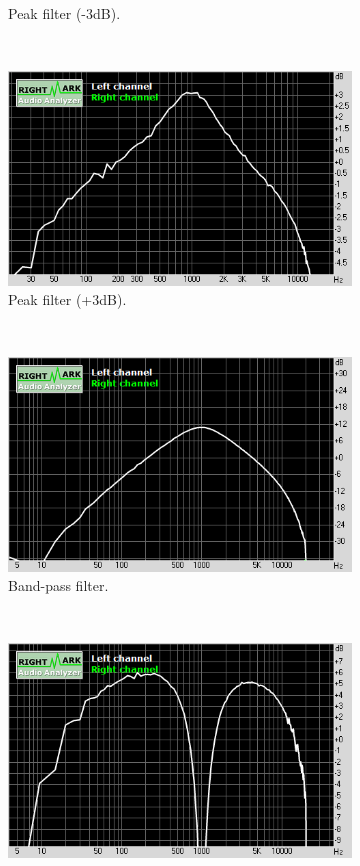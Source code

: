 \documentclass[a4paper,twoside,12pt]{book}
\begin{document}
\begin{figure}[h]
\begin{subfigure}[t]{0.45\textwidth}
        \caption{Peak filter (-3dB).}
    \end{subfigure}
    ~
    \centering
    \begin{subfigure}[t]{0.45\textwidth}
        \includegraphics[width=\textwidth]{images/3_peak_plus3}
        \caption{Peak filter (+3dB).}
    \end{subfigure}
    ~
    \centering
    \begin{subfigure}[t]{0.45\textwidth}
        \includegraphics[width=\textwidth]{images/2_band}
        \caption{Band-pass filter.}
    \end{subfigure}
    ~
    \centering
    \begin{subfigure}[t]{0.45\textwidth}
        \includegraphics[width=\textwidth]{images/4_notch}

\end{subfigure}
\end{figure}
\end{document}
